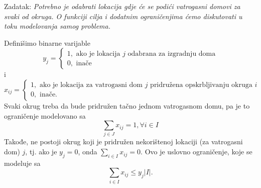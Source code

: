 \documentclass[a4paper, utf8, 11pt, colorlinks]{book}
\begin{document}
Zadatak: \emph{Potrebno je odabrati lokacija gdje će se podići vatrogasni domovi za svaki od okruga. O funkciji cilja i dodatnim ograničenjima ćemo diskutovati u toku modelovanja samog problema.}

Definišimo binarne varijable 
$$y_j = \begin{cases}
              1, \mbox{ ako je lokacija } j \mbox{ odabrana za izgradnju doma} \\
              0, \mbox{ inače}
        \end{cases}$$
i 
$$
x_{ij}= \begin{cases}
             1, \mbox{ ako je lokacija za vatrogasni dom } j \mbox{ pridružena opskrbljivanju okruga } i \\
             0, \mbox{ inače}. 
        \end{cases}
$$
Svaki okrug treba da bude pridružen tačno jednom vatrogasnom domu, pa je to ograničenje modelovano sa
\begin{equation}\label{eq:ex-constr-1}
      \sum_{j \in J} x_{ij} = 1, \forall i \in I
\end{equation}
Takođe, ne postoji okrug koji je pridružen nekorištenoj lokaciji (za vatrogasni dom) $j$, tj. ako je $y_j = 0$, onda $ \sum_{i \in I} x_{ij} = 0$. Ovo je uslovno ograničenje, koje se modeluje sa
\begin{equation}\label{eq:ex-constr-2}
    \sum_{i \in I} x_{ij} \leq y_j |I|.
 \end{equation}
\end{document}
